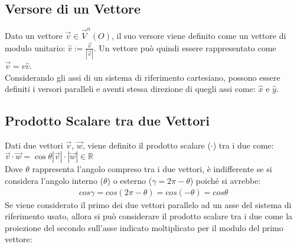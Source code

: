 \documentclass{article}
\numberwithin{equation}{subsection}
\begin{document}
\subsection{Versore di un Vettore}

Dato un vettore $\vec{v}\in\vec{V}^{n}{\left(O\right)}$, il suo versore viene definito come un vettore di modulo unitario: $\hat{v} := \frac{\displaystyle\vec{v}}{\displaystyle|\vec{v}|}$. 
Un vettore può quindi essere rappresentato come $\vec{v} = v\hat{v}$.\\
Considerando gli assi di un sistema di riferimento cartesiano, possono essere definiti i versori paralleli e aventi stessa direzione di quegli assi come: $\hat{x}$ e $\hat{y}$.

\subsection{Prodotto Scalare tra due Vettori}
Dati due vettori $\vec{v}$, $\vec{w}$, viene definito il prodotto scalare ($\cdot$) tra i due come: $\vec{v}\cdot\vec{w} = \cos\theta |\vec{v}|\cdot|\vec{w}| \in \mathbb{R}$\\
Dove $\theta$ rappresenta l'angolo compreso tra i due vettori, è indifferente se si considera l'angolo interno ($\theta$) o esterno ($\gamma = 2\pi - \theta$) poiché si avrebbe:
\begin{gather}
    cos\gamma = cos(2\pi - \theta) = cos(-\theta) = cos\theta
\end{gather}
Se viene considerato il primo dei due vettori parallelo ad un asse del sistema di riferimento usato, allora si può considerare
il prodotto scalare tra i due come la proiezione del secondo sull'asse indicato moltiplicato per il modulo del primo vettore:

\begin{center}\end{center}
\end{document}
